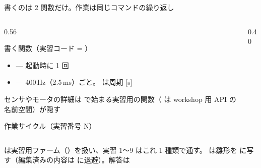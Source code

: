 \begin{frame}[fragile]{書くのは 2 関数だけ。作業は同じコマンドの繰り返し}
  \begin{columns}[T]
    \begin{column}{0.56\textwidth}
      \begin{block}{書く関数（実習コード = ）}
        \footnotesize
        \begin{itemize}\setlength{\itemsep}{1pt}
          \item {} --- 起動時に 1 回
          \item {} --- 400\,Hz（2.5\,ms）ごと。 は周期 [s]
        \end{itemize}
        センサやモータの詳細は  で始まる実習用の関数（ は workshop 用 API の名前空間）が隠す
      \end{block}
      \begin{exampleblock}{作業サイクル（実習番号 N）}
        \footnotesize
         \\
      \end{exampleblock}
    \end{column}
    \begin{column}{0.40\textwidth}
      \centering
    \end{column}
  \end{columns}

  \vspace{0.6em}
  {\scriptsize {} は実習用ファーム（）を扱い、実習 1〜9 はこれ 1 種類で通す。 は雛形を  に写す（編集済みの内容は  に退避）。解答は \par}
\end{frame}
